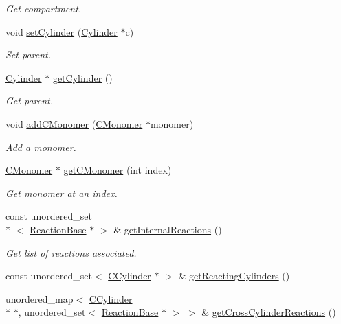 \begin{DoxyCompactItemize}
\begin{DoxyCompactList}\small\item\em Get compartment. \end{DoxyCompactList}\item 
void \hyperlink{classCCylinder_a8a0a3292e299521278152921ebfbce51}{set\+Cylinder} (\hyperlink{classCylinder}{Cylinder} $\ast$c)
\begin{DoxyCompactList}\small\item\em Set parent. \end{DoxyCompactList}\item 
\hyperlink{classCylinder}{Cylinder} $\ast$ \hyperlink{classCCylinder_a53332923a74acb20fe192d870215a687}{get\+Cylinder} ()
\begin{DoxyCompactList}\small\item\em Get parent. \end{DoxyCompactList}\item 
void \hyperlink{classCCylinder_a14fb0bbed36384ea72519e85ad4e91b8}{add\+C\+Monomer} (\hyperlink{classCMonomer}{C\+Monomer} $\ast$monomer)
\begin{DoxyCompactList}\small\item\em Add a monomer. \end{DoxyCompactList}\item 
\hyperlink{classCMonomer}{C\+Monomer} $\ast$ \hyperlink{classCCylinder_ac6b0fb293c40045db64365debca77c1d}{get\+C\+Monomer} (int index)
\begin{DoxyCompactList}\small\item\em Get monomer at an index. \end{DoxyCompactList}\item 
const unordered\+\_\+set\\*
$<$ \hyperlink{classReactionBase}{Reaction\+Base} $\ast$ $>$ \& \hyperlink{classCCylinder_a2bccfcdda7d524213d87066d1735fec9}{get\+Internal\+Reactions} ()
\begin{DoxyCompactList}\small\item\em Get list of reactions associated. \end{DoxyCompactList}\item 
const unordered\+\_\+set$<$ \hyperlink{classCCylinder}{C\+Cylinder} $\ast$ $>$ \& \hyperlink{classCCylinder_ac495877eae9e12fe90a9f4f85323d13f}{get\+Reacting\+Cylinders} ()
\item 
unordered\+\_\+map$<$ \hyperlink{classCCylinder}{C\+Cylinder} \\*
$\ast$, unordered\+\_\+set$<$ \hyperlink{classReactionBase}{Reaction\+Base} $\ast$ $>$ $>$ \& \hyperlink{classCCylinder_aa1fd48d90a614bd82268367a548eb8d5}{get\+Cross\+Cylinder\+Reactions} ()

\end{DoxyCompactItemize}

